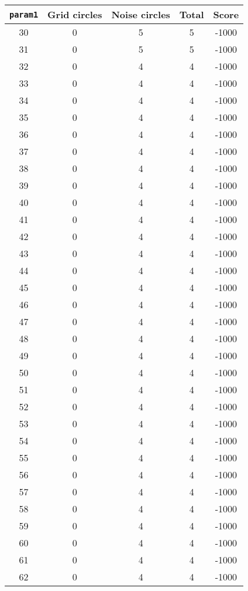 \documentclass[letterpaper, 12pt]{article}
\begin{document}
\begin{longtable}{|c|c|c|c|c|}
\hline
\textbf{\texttt{param1}} & \textbf{Grid circles} & \textbf{Noise circles} & \textbf{Total} & \textbf{Score} \\
\hline
30 & 0 & 5 & 5 & -1000 \\
\hline
31 & 0 & 5 & 5 & -1000 \\
\hline
32 & 0 & 4 & 4 & -1000 \\
\hline
33 & 0 & 4 & 4 & -1000 \\
\hline
34 & 0 & 4 & 4 & -1000 \\
\hline
35 & 0 & 4 & 4 & -1000 \\
\hline
36 & 0 & 4 & 4 & -1000 \\
\hline
37 & 0 & 4 & 4 & -1000 \\
\hline
38 & 0 & 4 & 4 & -1000 \\
\hline
39 & 0 & 4 & 4 & -1000 \\
\hline
40 & 0 & 4 & 4 & -1000 \\
\hline
41 & 0 & 4 & 4 & -1000 \\
\hline
42 & 0 & 4 & 4 & -1000 \\
\hline
43 & 0 & 4 & 4 & -1000 \\
\hline
44 & 0 & 4 & 4 & -1000 \\
\hline
45 & 0 & 4 & 4 & -1000 \\
\hline
46 & 0 & 4 & 4 & -1000 \\
\hline
47 & 0 & 4 & 4 & -1000 \\
\hline
48 & 0 & 4 & 4 & -1000 \\
\hline
49 & 0 & 4 & 4 & -1000 \\
\hline
50 & 0 & 4 & 4 & -1000 \\
\hline
51 & 0 & 4 & 4 & -1000 \\
\hline
52 & 0 & 4 & 4 & -1000 \\
\hline
53 & 0 & 4 & 4 & -1000 \\
\hline
54 & 0 & 4 & 4 & -1000 \\
\hline
55 & 0 & 4 & 4 & -1000 \\
\hline
56 & 0 & 4 & 4 & -1000 \\
\hline
57 & 0 & 4 & 4 & -1000 \\
\hline
58 & 0 & 4 & 4 & -1000 \\
\hline
59 & 0 & 4 & 4 & -1000 \\
\hline
60 & 0 & 4 & 4 & -1000 \\
\hline
61 & 0 & 4 & 4 & -1000 \\
\hline
62 & 0 & 4 & 4 & -1000 \\

\end{longtable}
\end{document}
